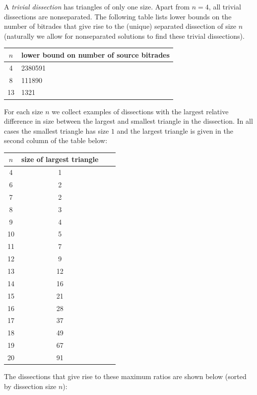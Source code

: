 \documentclass[12pt,amstags,fleqn]{article}
\theoremstyle{plain}
\theoremstyle{definition}
\theoremstyle{definition}
\begin{document}
A {\em trivial dissection} has triangles of only one size. Apart from
$n = 4$, all trivial dissections are nonseparated.  The following
table lists lower bounds on the number of bitrades that give rise to
the (unique) separated dissection of size $n$ (naturally we allow for
nonseparated solutions to find these trivial dissections).

\begin{center}
\begin{tabular}{|c|l|}
\hline
$n$ & lower bound on number of source bitrades \\
\hline
\hline 4 & 2380591 \\
\hline 8 & 111890 \\
\hline 13 & 1321 \\ 
\hline
\end{tabular}
\end{center}

For each size $n$ we collect examples of dissections with the largest
relative difference in size between the largest and smallest triangle in
the dissection. In all cases the smallest triangle has size $1$ and the
largest triangle  is given in the second column of the table below:

\begin{center}
\begin{tabular}{|c|c|c|c|}
\hline
$n$ & size of largest triangle \\
\hline
\hline 4 & 1 \\
\hline 6 & 2 \\
\hline 7 & 2 \\
\hline 8 & 3 \\
\hline 9 & 4 \\
\hline 10 & 5 \\
\hline 11 & 7 \\
\hline 12 & 9 \\
\hline 13 & 12 \\
\hline 14 & 16 \\
\hline 15 & 21 \\
\hline 16 & 28 \\
\hline 17 & 37 \\
\hline 18 & 49 \\
\hline 19 & 67 \\
\hline 20 & 91 \\
\hline
\end{tabular}
\end{center}

The dissections that give rise to these maximum ratios are shown below
(sorted by dissection size $n$):
\end{document}
